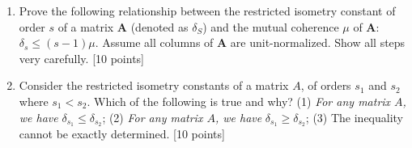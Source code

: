 \documentclass[11pt]{article}
\begin{document}
\begin{enumerate}
\item Prove the following relationship between the restricted isometry constant of order $s$ of a matrix $\boldsymbol{A}$ (denoted as $\delta_S$) and the mutual coherence $\mu$ of $\boldsymbol{A}$: $\delta_s \leq (s-1)\mu$. Assume all columns of $\boldsymbol{A}$ are unit-normalized. Show all steps very carefully. \textsf{[10 points]}

\item Consider the restricted isometry constants of a matrix $A$, of orders $s_1$ and $s_2$ where $s_1 < s_2$. Which of the following is true and why? (1) \textit{For any matrix $A$, we have} $\delta_{s_1} \leq  \delta_{s_2}$; (2) \textit{For any matrix $A$, we have} $\delta_{s_1} \geq \delta_{s_2}$; (3) The inequality cannot be exactly determined. \textsf{[10 points]}


\end{enumerate}
\end{document}
